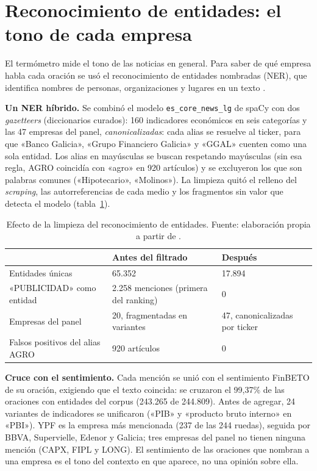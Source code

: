 \section{Reconocimiento de entidades: el tono de cada empresa}
\label{sec:ner-modelo}

El termómetro mide el tono de las noticias en general. Para saber de qué empresa habla cada
oración se usó el reconocimiento de entidades nombradas (NER), que identifica nombres de
personas, organizaciones y lugares en un texto \citep{tjongkimsang2002conll}.

\textbf{Un NER híbrido.} Se combinó el modelo \texttt{es\_core\_news\_lg} de spaCy
\citep{honnibal2020spacy} con dos \textit{gazetteers} (diccionarios curados): 160 indicadores
económicos en seis categorías y las 47 empresas del panel, \textit{canonicalizadas}: cada alias
se resuelve al ticker, para que «Banco Galicia», «Grupo Financiero Galicia» y «GGAL» cuenten como
una sola entidad. Los alias en mayúsculas se buscan respetando mayúsculas (sin esa regla, AGRO
coincidía con «agro» en 920 artículos) y se excluyeron los que son palabras comunes
(«Hipotecario», «Molinos»). La limpieza quitó el relleno del \textit{scraping}, las
autorreferencias de cada medio y los fragmentos sin valor que detecta el modelo
(tabla~\ref{tab:ner}).

\begin{table}[H]
\centering\footnotesize
\begin{tabular}{@{}lll@{}}
\toprule
 & \textbf{Antes del filtrado} & \textbf{Después} \\
\midrule
Entidades únicas & 65.352 & 17.894 \\
«PUBLICIDAD» como entidad & 2.258 menciones (primera del ranking) & 0 \\
Empresas del panel & 20, fragmentadas en variantes & 47, canonicalizadas por ticker \\
Falsos positivos del alias AGRO & 920 artículos & 0 \\
\bottomrule
\end{tabular}
\caption{Efecto de la limpieza del reconocimiento de entidades. Fuente: elaboración propia a
partir de .}
\label{tab:ner}
\end{table}

\textbf{Cruce con el sentimiento.} Cada mención se unió con el sentimiento FinBETO de su oración,
exigiendo que el texto coincida: se cruzaron el 99,37\% de las oraciones con entidades del corpus
(243.265 de 244.809). Antes de agregar, 24 variantes de indicadores se unificaron («PIB» y
«producto bruto interno» en «PBI»). YPF es la empresa más mencionada (237 de las 244 ruedas),
seguida por BBVA, Supervielle, Edenor y Galicia; tres empresas del panel no tienen ninguna
mención (CAPX, FIPL y LONG). El sentimiento de las oraciones que nombran a una empresa es el tono
del contexto en que aparece, no una opinión sobre ella.


